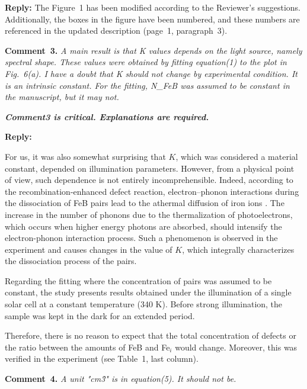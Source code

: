 \documentclass{WileyMSP-template}
\begin{document}
\noindent
\textcolor[rgb]{0.51,0.00,0.00}{\textbf{Reply:}}
The Figure~1 has been modified according to the Reviewer’s suggestions.
Additionally, the boxes in the figure have been numbered,
and these numbers are referenced in the updated description
(page~1, paragraph~3).


\vspace{1cm}
\noindent
\textcolor[rgb]{0.00,0.50,1.00}{\textbf{Comment~3.}}
\emph{A main result is that K values depends on the light source, namely spectral shape.
These values were obtained by fitting equation(1) to the plot in Fig.~6(a).
I have a doubt that K should not change by experimental condition.
It is an intrinsic constant.
For the fitting, N\_FeB was assumed to be constant in the manuscript, but it may not.}

\emph{
\textbf{Comment3 is critical. Explanations are required.}
}

\noindent
\textcolor[rgb]{0.51,0.00,0.00}{\textbf{Reply:}}


For us, it was also somewhat surprising that $K$,
which was considered a material constant, depended on illumination parameters.
However, from a physical point of view, such dependence is not entirely incomprehensible.
Indeed, according to the recombination-enhanced defect reaction,
electron--phonon interactions during the dissociation of FeB pairs lead to the athermal diffusion of iron ions \cite{FeBKin2019,KIMERLINGFeB}.
The increase in the number of phonons due to the thermalization of photoelectrons,
which occurs when higher energy photons are absorbed,
should intensify the electron-phonon interaction process.
Such a phenomenon is observed in the experiment and causes changes in the value of $K$,
which integrally characterizes the dissociation process of the pairs.

Regarding the fitting where the concentration of pairs was assumed to be constant,
the study presents results obtained under the illumination of a single solar cell at a constant temperature (340 K).
Before strong illumination, the sample was kept in the dark for an extended period.

Therefore, there is no reason to expect that the total concentration of defects or the ratio between the amounts
of FeB and Fe$_i$ would change.
Moreover, this was verified in the experiment (see Table~1, last column).


\vspace{1cm}
\noindent
\textcolor[rgb]{0.00,0.50,1.00}{\textbf{Comment~4.}}
\emph{A unit "cm\^3" is in equation(5). It should not be.}
\end{document}
